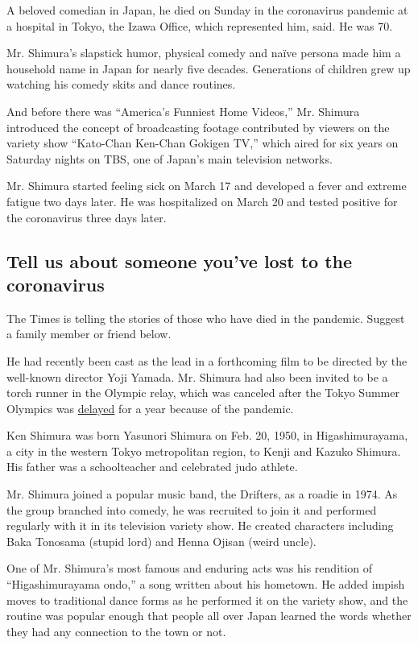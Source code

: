 A beloved comedian in Japan, he died on Sunday in the coronavirus
pandemic at a hospital in Tokyo, the Izawa Office, which represented
him, said. He was 70.

Mr. Shimura's slapstick humor, physical comedy and naïve persona made
him a household name in Japan for nearly five decades. Generations of
children grew up watching his comedy skits and dance routines.

And before there was ``America's Funniest Home Videos,'' Mr. Shimura
introduced the concept of broadcasting footage contributed by viewers on
the variety show ``Kato-Chan Ken-Chan Gokigen TV,'' which aired for six
years on Saturday nights on TBS, one of Japan's main television
networks.

Mr. Shimura started feeling sick on March 17 and developed a fever and
extreme fatigue two days later. He was hospitalized on March 20 and
tested positive for the coronavirus three days later.

\hypertarget{tell-us-about-someone-youve-lost-to-the-coronavirus}{%
\subsection{Tell us about someone you've lost to the
coronavirus}\label{tell-us-about-someone-youve-lost-to-the-coronavirus}}

The Times is telling the stories of those who have died in the pandemic.
Suggest a family member or friend below.

He had recently been cast as the lead in a forthcoming film to be
directed by the well-known director Yoji Yamada. Mr. Shimura had also
been invited to be a torch runner in the Olympic relay, which was
canceled after the Tokyo Summer Olympics was
\href{https://www.nytimes3xbfgragh.onion/2020/03/24/sports/olympics/coronavirus-summer-olympics-postponed.html}{delayed}
for a year because of the pandemic.

Ken Shimura was born Yasunori Shimura on Feb. 20, 1950, in
Higashimurayama, a city in the western Tokyo metropolitan region, to
Kenji and Kazuko Shimura. His father was a schoolteacher and celebrated
judo athlete.

Mr. Shimura joined a popular music band, the Drifters, as a roadie in
1974. As the group branched into comedy, he was recruited to join it and
performed regularly with it in its television variety show. He created
characters including Baka Tonosama (stupid lord) and Henna Ojisan (weird
uncle).

One of Mr. Shimura's most famous and enduring acts was his rendition of
``Higashimurayama ondo,'' a song written about his hometown. He added
impish moves to traditional dance forms as he performed it on the
variety show, and the routine was popular enough that people all over
Japan learned the words whether they had any connection to the town or
not.

